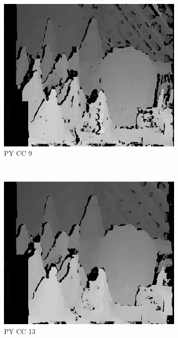\begin{figure}
  \begin{subfigure}[b]{0.23\textwidth}
    \centering
    \includegraphics[width=\textwidth]{images/stereo-pairs/cones_pyramid_crosschecked_9.png}
    \caption{PY CC 9}
  \end{subfigure}
  ~
  \begin{subfigure}[b]{0.23\textwidth}
    \centering
    \includegraphics[width=\textwidth]{images/stereo-pairs/cones_pyramid_crosschecked_13.png}
    \caption{PY CC 13}
  \end{subfigure}
  ~
  \begin{subfigure}[b]{0.23\textwidth}

\end{subfigure}
\end{figure}
